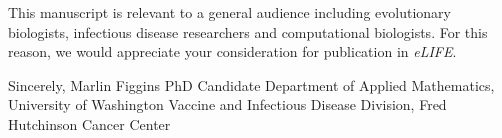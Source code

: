 \documentclass[11pt]{article}
\begin{document}
This manuscript is relevant to a general audience including evolutionary biologists, infectious disease researchers and computational biologists.
For this reason, we would appreciate your consideration for publication in \textit{eLIFE}.

\vspace{0.3in} %

Sincerely, \newline
\vspace{0.05in} \newline
Marlin Figgins \newline
PhD Candidate \newline
Department of Applied Mathematics, University of Washington \newline
Vaccine and Infectious Disease Division, Fred Hutchinson Cancer Center
\end{document}
